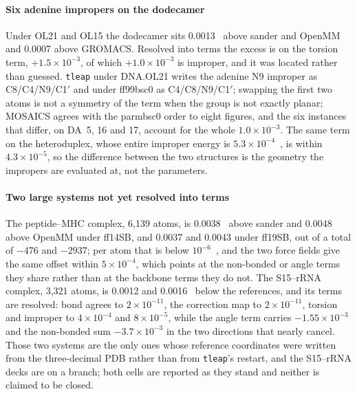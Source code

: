\paragraph{Six adenine impropers on the dodecamer}
Under OL21 and OL15 the dodecamer sits 0.0013~\kcal{} above sander and OpenMM
and 0.0007 above GROMACS. Resolved into terms the excess is on the torsion
term, $+1.5\times10^{-3}$, of which $+1.0\times10^{-3}$ is improper, and it
was located rather than guessed. \texttt{tleap} under DNA.OL21 writes the
adenine N9 improper as C8/C4/N9/C1$'$ and under ff99bsc0 as C4/C8/N9/C1$'$;
swapping the first two atoms is not a symmetry of the term when the group is
not exactly planar; MOSAICS agrees with the parmbsc0 order to eight figures,
and the six instances that differ, on DA~5, 16 and 17, account for the whole
$1.0\times10^{-3}$. The same term on the heteroduplex, whose entire improper
energy is $5.3\times10^{-4}$~\kcal{}, is within $4.3\times10^{-5}$, so the
difference between the two structures is the geometry the impropers are
evaluated at, not the parameters.

\paragraph{Two large systems not yet resolved into terms}
The peptide--MHC complex, 6,139 atoms, is 0.0038~\kcal{} above sander and 0.0048
above OpenMM under ff14SB, and 0.0037 and 0.0043 under ff19SB, out of a total of
$-476$ and $-2937$; per atom that is below $10^{-6}$~\kcal{}, and the two
force fields give the same offset within $5\times10^{-4}$, which points at the
non-bonded or angle terms they share rather than at the backbone terms they do
not. The S15--rRNA complex, 3,321 atoms, is 0.0012 and 0.0016~\kcal{} below the
references, and its terms are resolved: bond agrees to $2\times10^{-11}$, the
correction map to $2\times10^{-11}$, torsion and improper to $4\times10^{-4}$
and $8\times10^{-5}$, while the angle term carries $-1.55\times10^{-3}$ and the
non-bonded sum $-3.7\times10^{-3}$ in the two directions that nearly cancel.
Those two systems are the only ones whose reference coordinates were written
from the three-decimal PDB rather than from \texttt{tleap}'s restart, and the
S15--rRNA decks are on a branch; both cells are reported as they stand and
neither is claimed to be closed.

